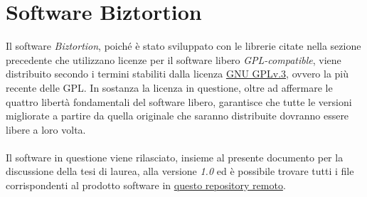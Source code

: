 \section{Software Biztortion}
Il software \textit{Biztortion}, poiché è stato sviluppato con le librerie citate nella sezione precedente che utilizzano licenze per il software libero \textit{GPL-compatible}, viene distribuito secondo i termini stabiliti dalla licenza \hyperref[sec:gpl]{GNU GPLv.3}, ovvero la più recente delle GPL. In sostanza la licenza in questione, oltre ad affermare le quattro libertà fondamentali del software libero, garantisce che tutte le versioni migliorate a partire da quella originale che saranno distribuite dovranno essere libere a loro volta. \\ \\
Il software in questione viene rilasciato, insieme al presente documento per la discussione della tesi di laurea, alla versione \textit{1.0} ed è possibile trovare tutti i file corrispondenti al prodotto software in \href{https://github.com/killbizz/Biztortion}{questo repository remoto}.